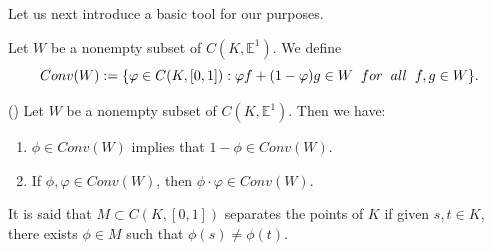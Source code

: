\documentclass[12pt]{amsart}
\begin{document}

Let us next introduce a basic tool for our purposes.

\begin{definition} \label{multi} Let $W$ be a nonempty subset of $C(K, \mathbb{E}^1)$. We define
$$Conv(W):=\{ \varphi \in C(K, [0,1]): \varphi f + (1 - \varphi) g \in W \hspace{0,2cm} for \hspace{0,2cm} all \hspace{0,2cm} f,g \in W \}.$$
\end{definition}

\begin{proposition} \label{multiplier} (\cite[Proposition 3.2]{FSS17}) Let $W$ be a nonempty subset of $C(K, \mathbb{E}^1)$. Then we have:
\begin{enumerate}
\item $\phi \in Conv(W)$ implies that $1 - \phi \in Conv(W)$.
\item If $\phi, \varphi \in Conv(W)$, then $\phi \cdot \varphi \in Conv(W)$.
\end{enumerate}
\end{proposition}

%
%
%
%

\begin{definition}
It is said that $M \subset C(K, [0, 1])$ separates the points of $K$ if given $s, t \in K$, there exists $\phi \in M$ such that $\phi(s) \not= \phi(t)$.
\end{definition}
\end{document}
